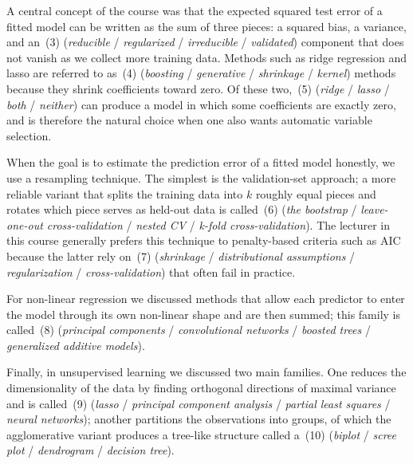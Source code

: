 \documentclass[11pt,a4paper]{article}
\begin{document}
A central concept of the course was that the expected squared test error of a fitted model can be written as the sum of three pieces: a squared bias, a variance, and an \underline{\hspace{2.5cm}}\,(3) (\emph{reducible} / \emph{regularized} / \emph{irreducible} / \emph{validated}) component that does not vanish as we collect more training data. Methods such as ridge regression and lasso are referred to as \underline{\hspace{2.5cm}}\,(4) (\emph{boosting} / \emph{generative} / \emph{shrinkage} / \emph{kernel}) methods because they shrink coefficients toward zero. Of these two, \underline{\hspace{2.5cm}}\,(5) (\emph{ridge} / \emph{lasso} / \emph{both} / \emph{neither}) can produce a model in which some coefficients are exactly zero, and is therefore the natural choice when one also wants automatic variable selection.

When the goal is to estimate the prediction error of a fitted model honestly, we use a resampling technique. The simplest is the validation-set approach; a more reliable variant that splits the training data into $k$ roughly equal pieces and rotates which piece serves as held-out data is called \underline{\hspace{2.5cm}}\,(6) (\emph{the bootstrap} / \emph{leave-one-out cross-validation} / \emph{nested CV} / \emph{k-fold cross-validation}). The lecturer in this course generally prefers this technique to penalty-based criteria such as AIC because the latter rely on \underline{\hspace{2.5cm}}\,(7) (\emph{shrinkage} / \emph{distributional assumptions} / \emph{regularization} / \emph{cross-validation}) that often fail in practice.

For non-linear regression we discussed methods that allow each predictor to enter the model through its own non-linear shape and are then summed; this family is called \underline{\hspace{2.5cm}}\,(8) (\emph{principal components} / \emph{convolutional networks} / \emph{boosted trees} / \emph{generalized additive models}).

Finally, in unsupervised learning we discussed two main families. One reduces the dimensionality of the data by finding orthogonal directions of maximal variance and is called \underline{\hspace{2.5cm}}\,(9) (\emph{lasso} / \emph{principal component analysis} / \emph{partial least squares} / \emph{neural networks}); another partitions the observations into groups, of which the agglomerative variant produces a tree-like structure called a \underline{\hspace{2.5cm}}\,(10) (\emph{biplot} / \emph{scree plot} / \emph{dendrogram} / \emph{decision tree}).
\end{document}
